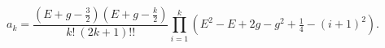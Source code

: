 \begin{equation}
\nonumber
a_k = \frac{\left(E + g - \tfrac{3}{2} \right)
\left(E+g-\tfrac{k}{2} \right)} {k!~(2k+1)!!}
\prod_{i=1}^{k} \left(E^2-E+ 2g - g^2 + \tfrac{1}{4} - \left(i+1
\right)^2 
\right).
\end{equation} 
